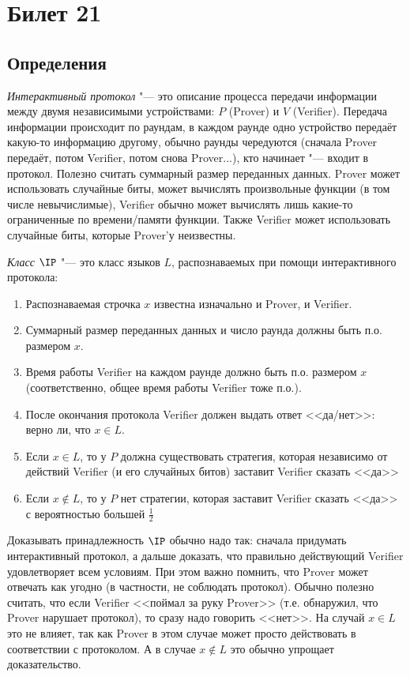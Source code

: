 \setcounter{section}{20}
\section{Билет 21}
\subsection{Определения}
	\begin{Def}
		\textit{Интерактивный протокол} "--- это описание процесса передачи информации между двумя независимыми устройствами: $P$ (Prover) и $V$ (Verifier).
		Передача информации происходит по раундам, в каждом раунде одно устройство передаёт какую-то информацию другому, обычно раунды чередуются
		(сначала Prover передаёт, потом Verifier, потом снова Prover...), кто начинает "--- входит в протокол.
		Полезно считать суммарный размер переданных данных.
		Prover может использовать случайные биты, может вычислять произвольные функции (в том числе невычислимые), Verifier обычно может вычислять лишь какие-то ограниченные по времени/памяти функции.
		Также Verifier может использовать случайные биты, которые Prover'у неизвестны.
	\end{Def}
	\begin{Def}
		\textit{Класс $\IP$} "--- это класс языков $L$, распознаваемых при помощи интерактивного протокола:
		\begin{enumerate}
			\item Распознаваемая строчка $x$ известна изначально и Prover, и Verifier.
			\item Суммарный размер переданных данных и число раунда должны быть п.о. размером $x$.
			\item Время работы Verifier на каждом раунде должно быть п.о. размером $x$ (соответственно, общее время работы Verifier тоже п.о.).
			\item После окончания протокола Verifier должен выдать ответ <<да/нет>>: верно ли, что $x \in L$.
			\item Если $x \in L$, то у $P$ должна существовать стратегия, которая независимо от действий Verifier (и его случайных битов) заставит Verifier сказать <<да>>
			\item Если $x \notin L$, то у $P$ нет стратегии, которая заставит Verifier сказать <<да>> с вероятностью большей $\frac 12$
		\end{enumerate}
	\end{Def}
	\begin{Rem}
		Доказывать принадлежность $\IP$ обычно надо так: сначала придумать интерактивный протокол, а дальше доказать, что правильно действующий Verifier удовлетворяет всем условиям.
		При этом важно помнить, что Prover может отвечать как угодно (в частности, не соблюдать протокол).
		Обычно полезно считать, что если Verifier <<поймал за руку Prover>> (т.е. обнаружил, что Prover нарушает протокол), то сразу надо говорить <<нет>>.
		На случай $x \in L$ это не влияет, так как Prover в этом случае может просто действовать в соответствии с протоколом.
		А в случае $x \notin L$ это обычно упрощает доказательство.
	\end{Rem}
